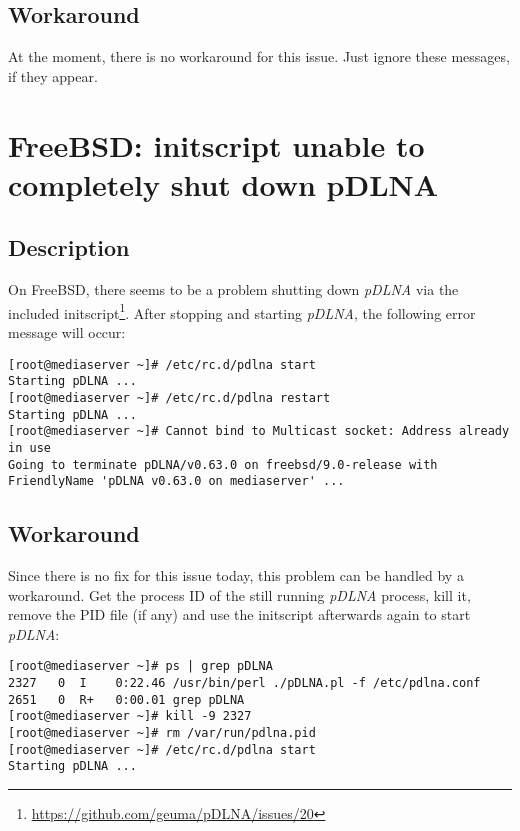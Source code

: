 \subsection{Workaround}

At the moment, there is no workaround for this issue. Just ignore these messages, if they appear.

\section{FreeBSD: initscript unable to completely shut down pDLNA}

\subsection{Description}

On FreeBSD, there seems to be a problem shutting down {\em pDLNA} via the included initscript\footnote{\url{https://github.com/geuma/pDLNA/issues/20}}. After stopping and starting {\em pDLNA}, the following error message will occur:
\begin{lstlisting}
[root@mediaserver ~]# /etc/rc.d/pdlna start
Starting pDLNA ...
[root@mediaserver ~]# /etc/rc.d/pdlna restart
Starting pDLNA ...
[root@mediaserver ~]# Cannot bind to Multicast socket: Address already in use
Going to terminate pDLNA/v0.63.0 on freebsd/9.0-release with FriendlyName 'pDLNA v0.63.0 on mediaserver' ...
\end{lstlisting}

\subsection{Workaround}

Since there is no fix for this issue today, this problem can be handled by a workaround. Get the process ID of the still running {\em pDLNA} process, kill it, remove the PID file (if any) and use the initscript afterwards again to start {\em pDLNA}:
\begin{lstlisting}
[root@mediaserver ~]# ps | grep pDLNA
2327   0  I    0:22.46 /usr/bin/perl ./pDLNA.pl -f /etc/pdlna.conf
2651   0  R+   0:00.01 grep pDLNA
[root@mediaserver ~]# kill -9 2327
[root@mediaserver ~]# rm /var/run/pdlna.pid
[root@mediaserver ~]# /etc/rc.d/pdlna start
Starting pDLNA ...
\end{lstlisting}